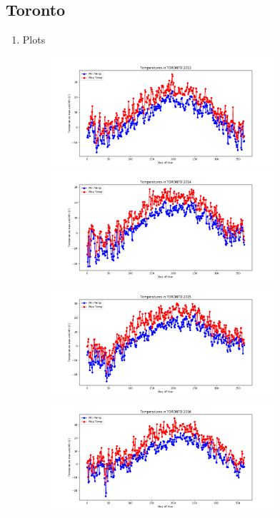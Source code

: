 \documentclass{article}
\begin{document}
\subsection{ \bf Toronto }

\begin{enumerate}

\item  Plots 

\begin{center}
\begin{figure}[!h]
\includegraphics[width=3.25in]{../Plot/Toronto/day_vs_temp_2013.png}

\includegraphics[width=3.25in]{../Plot/Toronto/day_vs_temp_2014.png}

\includegraphics[width=3.25in]{../Plot/Toronto/day_vs_temp_2015.png}

\includegraphics[width=3.25in]{../Plot/Toronto/day_vs_temp_2016.png}


\end{figure}
\end{center}
\end{enumerate}
\end{document}
